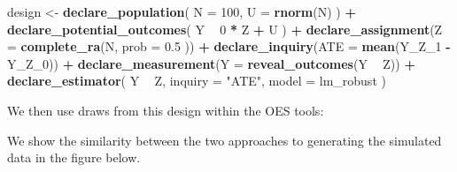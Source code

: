 \documentclass[
  12pt,
]{book}
\newenvironment{Shaded}{\begin{snugshade}}{\end{snugshade}}
\newcommand{\DataTypeTok}[1]{\textcolor[rgb]{0.13,0.29,0.53}{#1}}
\newcommand{\DecValTok}[1]{\textcolor[rgb]{0.00,0.00,0.81}{#1}}
\newcommand{\FloatTok}[1]{\textcolor[rgb]{0.00,0.00,0.81}{#1}}
\newcommand{\KeywordTok}[1]{\textcolor[rgb]{0.13,0.29,0.53}{\textbf{#1}}}
\newcommand{\NormalTok}[1]{#1}
\newcommand{\OperatorTok}[1]{\textcolor[rgb]{0.81,0.36,0.00}{\textbf{#1}}}
\newcommand{\StringTok}[1]{\textcolor[rgb]{0.31,0.60,0.02}{#1}}
\theoremstyle{definition}
\theoremstyle{definition}
\theoremstyle{definition}
\theoremstyle{remark}
\begin{document}
\begin{Shaded}
\begin{Highlighting}[]
\NormalTok{design <-}\StringTok{ }\KeywordTok{declare_population}\NormalTok{(}
  \DataTypeTok{N =} \DecValTok{100}\NormalTok{,}
  \DataTypeTok{U =} \KeywordTok{rnorm}\NormalTok{(N)}
\NormalTok{) }\OperatorTok{+}
\StringTok{  }\KeywordTok{declare_potential_outcomes}\NormalTok{(}
\NormalTok{    Y }\OperatorTok{~}\StringTok{ }\DecValTok{0} \OperatorTok{*}\StringTok{ }\NormalTok{Z }\OperatorTok{+}\StringTok{ }\NormalTok{U}
\NormalTok{  ) }\OperatorTok{+}
\StringTok{  }\KeywordTok{declare_assignment}\NormalTok{(}\DataTypeTok{Z =} \KeywordTok{complete_ra}\NormalTok{(N,}
    \DataTypeTok{prob =} \FloatTok{0.5}
\NormalTok{  )) }\OperatorTok{+}
\StringTok{  }\KeywordTok{declare_inquiry}\NormalTok{(}\DataTypeTok{ATE =} \KeywordTok{mean}\NormalTok{(Y_Z_}\DecValTok{1} \OperatorTok{-}\StringTok{ }\NormalTok{Y_Z_}\DecValTok{0}\NormalTok{)) }\OperatorTok{+}
\StringTok{  }\KeywordTok{declare_measurement}\NormalTok{(}\DataTypeTok{Y =} \KeywordTok{reveal_outcomes}\NormalTok{(Y }\OperatorTok{~}\StringTok{ }\NormalTok{Z)) }\OperatorTok{+}
\StringTok{  }\KeywordTok{declare_estimator}\NormalTok{(}
\NormalTok{    Y }\OperatorTok{~}\StringTok{ }\NormalTok{Z,}
    \DataTypeTok{inquiry =} \StringTok{"ATE"}\NormalTok{,}
    \DataTypeTok{model =}\NormalTok{ lm_robust}
\NormalTok{  )}
\end{Highlighting}
\end{Shaded}

We then use draws from this design within the OES tools:

\begin{Shaded}
\end{Shaded}

We show the similarity between the two approaches to generating the
simulated data in the figure below.
\end{document}

